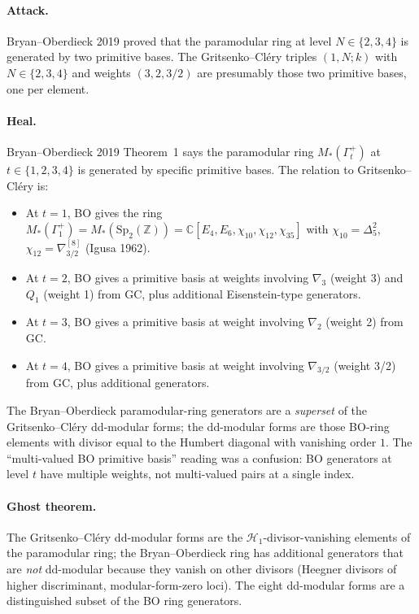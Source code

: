\paragraph{Attack.} Bryan--Oberdieck 2019 proved that the paramodular
ring at level $N \in \{2, 3, 4\}$ is generated by two primitive bases.
The Gritsenko--Cl\'ery triples $(1, N; k)$ with $N \in \{2, 3, 4\}$
and weights $(3, 2, 3/2)$ are presumably those two primitive bases,
one per element.

\paragraph{Heal.} Bryan--Oberdieck 2019 Theorem~1 says the paramodular
ring $M_*(\Gamma_t^+)$ at $t \in \{1, 2, 3, 4\}$ is generated by
specific primitive bases. The relation to Gritsenko--Cl\'ery is:
\begin{itemize}
\item At $t = 1$, BO gives the ring $M_*(\Gamma_1^+) = M_*(\mathrm{Sp}_2
(\mathbb{Z})) = \mathbb{C}[E_4, E_6, \chi_{10}, \chi_{12}, \chi_{35}]$
with $\chi_{10} = \Delta_5^2$, $\chi_{12} = \nabla_{3/2}^{[8]}$
(Igusa 1962).
\item At $t = 2$, BO gives a primitive basis at weights involving
$\nabla_3$ (weight 3) and $Q_1$ (weight 1) from GC, plus additional
Eisenstein-type generators.
\item At $t = 3$, BO gives a primitive basis at weight involving
$\nabla_2$ (weight 2) from GC.
\item At $t = 4$, BO gives a primitive basis at weight involving
$\nabla_{3/2}$ (weight 3/2) from GC, plus additional generators.
\end{itemize}
The Bryan--Oberdieck paramodular-ring generators are a \emph{superset}
of the Gritsenko--Cl\'ery dd-modular forms; the dd-modular forms are
those BO-ring elements with divisor equal to the Humbert diagonal
with vanishing order $1$. The ``multi-valued BO primitive basis''
reading was a confusion: BO generators at level $t$ have multiple
weights, not multi-valued pairs at a single index.

\paragraph{Ghost theorem.} The Gritsenko--Cl\'ery dd-modular forms are
the $\mathcal{H}_1$-divisor-vanishing elements of the paramodular
ring; the Bryan--Oberdieck ring has additional generators that are
\emph{not} dd-modular because they vanish on other divisors (Heegner
divisors of higher discriminant, modular-form-zero loci). The eight
dd-modular forms are a distinguished subset of the BO ring generators.

